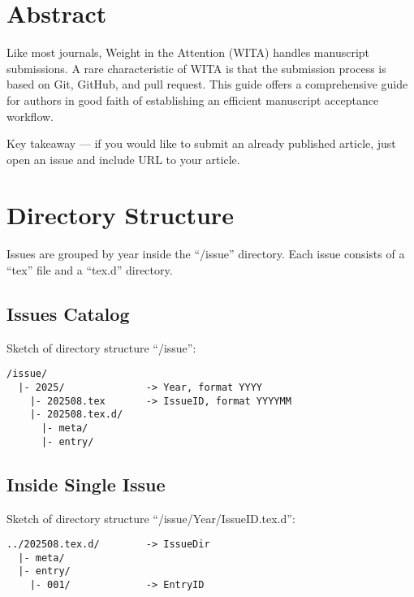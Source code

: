 


\providecommand{\showcmd}[0]{}
\providecommand{\showcmdparam}[0]{}
\renewcommand{\showcmd}[1]{\strut{\textbackslash#1}}
\renewcommand{\showcmdparam}[1]{\strut\textbraceleft{#1}\textbraceright}





\section*{Abstract}
Like most journals, Weight in the Attention (WITA) handles manuscript submissions.
A rare characteristic of WITA is that the submission process is based on Git, GitHub, and pull request.
This guide offers a comprehensive guide for authors in good faith of establishing an efficient manuscript acceptance workflow.

Key takeaway --- if you would like to submit an already published article, just open an issue and include URL to your article.



\section{Directory Structure}
Issues are grouped by year inside the ``/issue'' directory.
Each issue consists of a ``tex'' file and a ``tex.d'' directory.


\subsection{Issues Catalog}
Sketch of directory structure ``/issue'':

\begin{lstlisting}
/issue/
  |- 2025/              -> Year, format YYYY
    |- 202508.tex       -> IssueID, format YYYYMM
    |- 202508.tex.d/
      |- meta/
      |- entry/
\end{lstlisting}


\subsection{Inside Single Issue}
Sketch of directory structure ``/issue/Year/IssueID.tex.d'':

\begin{lstlisting}
../202508.tex.d/        -> IssueDir
  |- meta/
  |- entry/
    |- 001/             -> EntryID
\end{lstlisting}



